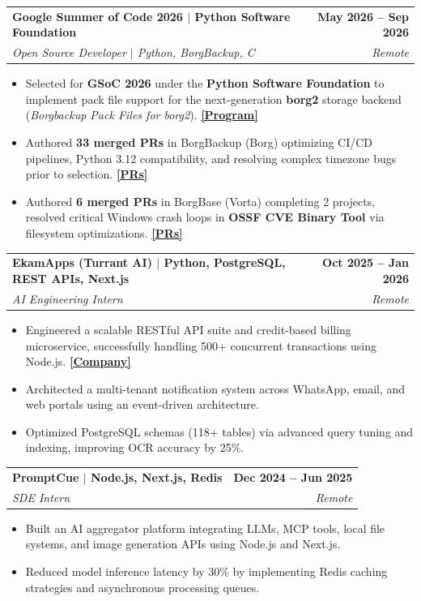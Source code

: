 \documentclass[letterpaper,11pt]{article}
\makeatletter
\newcommand{\resumeItem}[1]{
  \item\small{
    {#1 \vspace{-2pt}}
  }
}
\newcommand{\resumeSubheading}[4]{
  \vspace{-2pt}\item
    \begin{tabular*}{1.0\textwidth}[t]{l@{\extracolsep{\fill}}r}
      \textbf{#1} & \textbf{\small #2} \\
      \textit{\small#3} & \textit{\small #4} \\
    \end{tabular*}\vspace{-7pt}
}
\newcommand{\resumeItemListStart}{\begin{itemize}[itemsep=-2pt]}
\newcommand{\resumeItemListEnd}{\end{itemize}\vspace{-5pt}}
\makeatother
\begin{document}
    \resumeSubheading
      {\textbf{Google Summer of Code 2026} $|$ \textmd{Python Software Foundation}}{May 2026 -- Sep 2026}
      {Open Source Developer $|$ Python, BorgBackup, C}{Remote}
      \resumeItemListStart
        \resumeItem{Selected for \textbf{GSoC 2026} under the \textbf{Python Software Foundation} to implement pack file support for the next-generation \textbf{borg2} storage backend (\textit{Borgbackup Pack Files for borg2}). \hspace*{\fill} \href{https://summerofcode.withgoogle.com/programs/2026/organizations/python-software-foundation}{\textbf{[Program]}}}
        \resumeItem{Authored \textbf{33 merged PRs} in BorgBackup (Borg) optimizing CI/CD pipelines, Python 3.12 compatibility, and resolving complex timezone bugs prior to selection. \hspace*{\fill} \href{https://github.com/borgbackup/borg/pulls?q=is\%3Amerged+is\%3Apr+author\%3AAdshkumar}{\textbf{[PRs]}}}
        \resumeItem{Authored \textbf{6 merged PRs} in BorgBase (Vorta) completing 2 projects, resolved critical Windows crash loops in \textbf{OSSF CVE Binary Tool} via filesystem optimizations. \hspace*{\fill} \href{https://github.com/borgbase/vorta/pulls?q=is\%3Amerged+is\%3Apr+author\%3AAdshkumar}{\textbf{[PRs]}}}
      \resumeItemListEnd

    \resumeSubheading
      {\textbf{EkamApps (Turrant AI)} $|$ \textmd{Python, PostgreSQL, REST APIs, Next.js}}{Oct 2025 -- Jan 2026}
      {AI Engineering Intern}{Remote}
      \resumeItemListStart
        \resumeItem{Engineered a scalable RESTful API suite and credit-based billing microservice, successfully handling 500+ concurrent transactions using Node.js. \hspace*{\fill} \href{https://turrant.ai/}{\textbf{[Company]}}}
        \resumeItem{Architected a multi-tenant notification system across WhatsApp, email, and web portals using an event-driven architecture.}
        \resumeItem{Optimized PostgreSQL schemas (118+ tables) via advanced query tuning and indexing, improving OCR accuracy by 25\%.}
      \resumeItemListEnd

    \resumeSubheading
      {\textbf{PromptCue} $|$ \textmd{Node.js, Next.js, Redis}}{Dec 2024 -- Jun 2025}
      {SDE Intern}{Remote}
      \resumeItemListStart
        \resumeItem{Built an AI aggregator platform integrating LLMs, MCP tools, local file systems, and image generation APIs using Node.js and Next.js.}
        \resumeItem{Reduced model inference latency by 30\% by implementing Redis caching strategies and asynchronous processing queues.}
      \resumeItemListEnd
\end{document}
